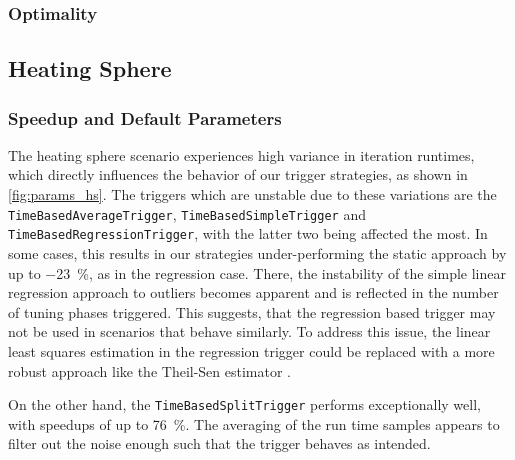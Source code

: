 \subsubsection{Optimality}

\newpage
\subsection{Heating Sphere}
\subsubsection{Speedup and Default Parameters}
The heating sphere scenario experiences high variance in iteration runtimes, which directly influences the behavior of our trigger strategies, as shown in \autoref{fig:params_hs}.
The triggers which are unstable due to these variations are the \texttt{TimeBasedAverageTrigger}, \texttt{TimeBasedSimpleTrigger} and \texttt{TimeBasedRegressionTrigger}, with the latter two being affected the most. In some cases, this results in our strategies under-performing the static approach by up to \qty{-23}{\percent}, as in the regression case. There, the instability of the simple linear regression approach to outliers becomes apparent and is reflected in the number of tuning phases triggered. This suggests, that the regression based trigger may not be used in scenarios that behave similarly. To address this issue, the linear least squares estimation in the regression trigger could be replaced with a more robust approach like the Theil-Sen estimator \cite{Wilcox2012}.

On the other hand, the \texttt{TimeBasedSplitTrigger} performs exceptionally well, with speedups of up to \qty{76}{\percent}. The averaging of the run time samples appears to filter out the noise enough such that the trigger behaves as intended.


